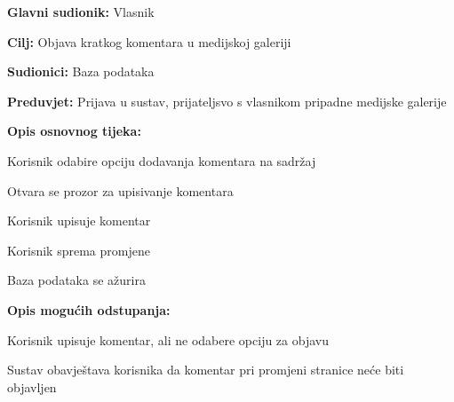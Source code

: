 				\noindent {}
				\begin{packed_item}
					
					\item \textbf{Glavni sudionik: } Vlasnik
					\item  \textbf{Cilj:} Objava kratkog komentara u medijskoj galeriji
					\item  \textbf{Sudionici:} Baza podataka
					\item  \textbf{Preduvjet:} Prijava u sustav, prijateljsvo s vlasnikom pripadne medijske galerije
					\item  \textbf{Opis osnovnog tijeka:}
					
					\item[] \begin{packed_enum}
						
						\item Korisnik odabire opciju dodavanja komentara na sadržaj
						\item Otvara se prozor za upisivanje komentara
						\item Korisnik upisuje komentar
						\item Korisnik sprema promjene
						\item Baza podataka se ažurira
					\end{packed_enum}
					
					\item  \textbf{Opis mogućih odstupanja:}
					
					\item[] \begin{packed_item}
						
						\item[3.a] Korisnik upisuje komentar, ali ne odabere opciju za objavu
						\item[] \begin{packed_enum}
							
							\item Sustav obavještava korisnika da komentar pri promjeni stranice neće biti objavljen
							
						\end{packed_enum}
						
					\end{packed_item}
				\end{packed_item}
				
